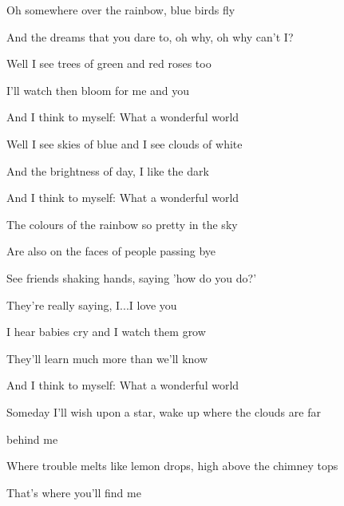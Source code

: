 \begin{song}
Oh somewhere over the rainbow, blue birds fly \par
{}And the dreams that you dare to, oh why, oh why can't I?  \par

\bigskip

Well I see trees of green and  red roses too \par
{} I'll watch then bloom for  me and you \par
And I  think to myself:  What a wonderful world  \par

\bigskip

Well I see skies of blue and I see  clouds of white \par
And the brightness of day,  I like the dark \par
And I  think to myself:  What a wonderful world  \par

\bigskip

The colours of the rainbow so pretty in the sky \par
Are also on the faces of people passing bye \par
See friends shaking hands, saying  'how do you do?' \par
{} They're really saying, I...I love you \par

\bigskip

I hear babies cry and I  watch them grow \par
{} They'll learn much more  than we'll know \par
And I  think to myself:  What a wonderful world  \par

\bigskip

Someday I'll wish upon a star, wake up where the clouds are far \par
behind me \par
Where trouble melts like lemon drops, high above the chimney tops \par
That's where you'll find me \par


\end{song}
